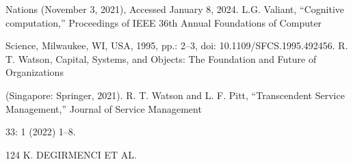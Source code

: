 \documentclass[10pt,a4paper]{article}
\begin{document}
Nations (November 3, 2021), Accessed January 8, 2024. L.G. Valiant, “Cognitive computation,” Proceedings of IEEE 36th Annual Foundations of Computer

Science, Milwaukee, WI, USA, 1995, pp.: 2–3, doi: 10.1109/SFCS.1995.492456. R. T. Watson, Capital, Systems, and Objects: The Foundation and Future of Organizations

(Singapore: Springer, 2021). R. T. Watson and L. F. Pitt, “Transcendent Service Management,” Journal of Service Management

33: 1 (2022) 1–8.

124 K. DEGIRMENCI ET AL.
\end{document}
